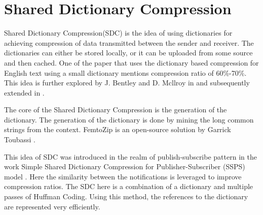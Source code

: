\section{Shared Dictionary Compression}

Shared Dictionary Compression(SDC) is the idea of using dictionaries for achieving compression of data transmitted between the sender and receiver. The dictionaries can either be stored locally, or it can be uploaded from some source and then cached. One of the paper\parencite{Bell:1989:MTC:76894.76896} that uses the dictionary based compression for English text using a small dictionary mentions compression ratio of 60\%-70\%. This idea is further explored by J. Bentley and D. Mcllroy in \parencite{755678} and subsequently extended in \parencite{Bentley:2001:DCL:508081.508083}.

The core of the Shared Dictionary Compression is the generation of the dictionary. The generation of the dictionary is done by mining the long common strings from the context. FemtoZip \parencite{femtozip} is an open-source solution by Garrick Toubassi \parencite{sdc_linkedin}.

This idea of SDC was introduced in the realm of publish-subscribe pattern in the work Simple Shared Dictionary Compression for Publisher-Subscriber (SSPS) model \parencite{Doblander:2016:SDC}. Here the similarity between the notifications is leveraged to improve compression ratios. The SDC here is a combination of a dictionary and multiple passes of Huffman Coding. Using this method, the references to the dictionary are represented very efficiently. 